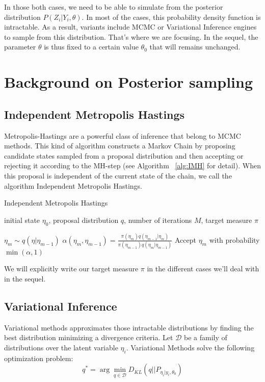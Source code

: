 \documentclass{article}
\begin{document}
In those both cases, we need to be able to simulate from the posterior distribution $P(Z_i|Y_i,\theta)$. In most of the cases, this probability density function is intractable. As a result, variants include MCMC or Variational Inference engines to sample from this distribution. That's where we are focusing. In the sequel, the parameter $\theta$ is thus fixed to a certain value $\theta_0$ that will remains unchanged.\\

\section{Background on Posterior sampling} 
 
\subsection{Independent Metropolis Hastings}
Metropolis-Hastings are a powerful class of inference that belong to MCMC methods. This kind of algorithm constructs a Markov Chain by proposing candidate states sampled from a proposal distribution and then accepting or rejecting it according to the MH-step (see Algorithm ~\ref{alg:IMH} for detail). When this proposal is independent of the current state of the chain, we call the algorithm Independent Metropolis Hastings.

\begin{algorithm}[h]
   \caption{Independent Metropolis Hastings}
   \label{alg:IMH}
\begin{algorithmic}
    initial state $\eta_0$, proposal distribution $q$, number of iterations $M$, target measure $\pi$


   \STATE $\eta_m \sim q(\eta|\eta_{m-1})$
   \STATE $\alpha(\eta_m,\eta_{m-1}) = \frac{\pi(\eta_m) q(\eta_{m-1}|\eta_{m})}{\pi(\eta_{m-1}) q(\eta_{m}|\eta_{m-1})}$
   \STATE Accept $\eta_m$ with probability $\min(\alpha,1)$
   \ENDFOR

\end{algorithmic}
\end{algorithm}

We will explicitly write our target measure $\pi$ in the different cases we'll deal with in the sequel.\\

\subsection{Variational Inference}
Variational methods approximates those intractable distributions by finding the best distribution minimizing a divergence criteria. Let $\mathcal{D}$ be a family of distributions over the latent variable $\eta_i$. Variational Methods solve the following optimization problem:
\begin{equation}
q^* = \arg \min \limits_{q \in \mathcal{D}} D_{KL}(q||P_{\eta_i|y_i,\theta_0})
\end{equation}
\end{document}
